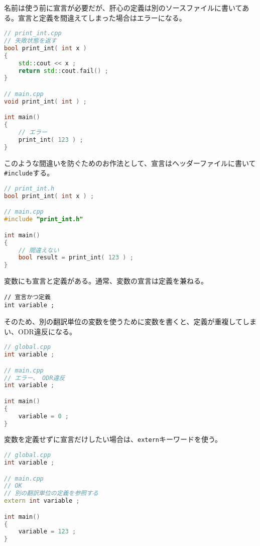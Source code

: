 名前は使う前に宣言が必要だが、肝心の定義は別のソースファイルに書いてある。宣言と定義を間違えてしまった場合はエラーになる。

\begin{lstlisting}[language={C++}]
// print_int.cpp
// 失敗状態を返す
bool print_int( int x )
{
    std::cout << x ;
    return std::cout.fail() ;
}

// main.cpp
void print_int( int ) ;

int main()
{
    // エラー
    print_int( 123 ) ;
}
\end{lstlisting}

このような間違いを防ぐためのお作法として、宣言はヘッダーファイルに書いて\,\texttt{\#include}する。

\begin{lstlisting}[language={C++}]
// print_int.h
bool print_int( int x ) ;

// main.cpp
#include "print_int.h"

int main()
{
    // 間違えない
    bool result = print_int( 123 ) ;
}
\end{lstlisting}


変数にも宣言と定義がある。通常、変数の宣言は定義を兼ねる。

\begin{lstlisting}[style=grammar]
// 宣言かつ定義
int variable ;
\end{lstlisting}

そのため、別の翻訳単位の変数を使うために変数を書くと、定義が重複してしまい、ODR違反になる。

\begin{lstlisting}[language={C++}]
// global.cpp
int variable ;

// main.cpp
// エラー、 ODR違反
int variable ;

int main()
{
    variable = 0 ;
}
\end{lstlisting}

変数を定義せずに宣言だけしたい場合は、\texttt{extern}キーワードを使う。

\begin{lstlisting}[language={C++}]
// global.cpp
int variable ;

// main.cpp
// OK
// 別の翻訳単位の定義を参照する
extern int variable ;

int main()
{
    variable = 123 ;
}
\end{lstlisting}

